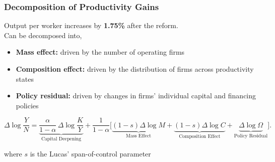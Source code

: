\documentclass[aspectratio=169,xcolor=table]{beamer}
\begin{document}
\begin{frame}[label=Decomp_main] \frametitle{Decomposition of Productivity Gains  \hfill  \hyperlink{decompA}{}}

Output per worker increases by \textbf{1.75\%} after the reform. \vspace{3mm} \\

Can be decomposed into,
\begin{itemize} \small
    \item \textbf{Mass effect:} driven by the number of operating firms  
    \item \textbf{Composition effect:} driven by the distribution of firms across productivity states 
    \item \textbf{Policy residual:} driven by changes in firms’ individual capital and financing policies 
\end{itemize} \normalsize


\[
\Delta\log\frac{Y}{N}
= \underbrace{\frac{\alpha}{1-\alpha}\,\Delta\log\frac{K}{Y}}_{\text{Capital Deepening}}
+ \frac{1}{1-\alpha}\Big[
\underbrace{(1-s)\Delta\log M}_{\text{Mass Effect}} +  
\underbrace{(1-s)\Delta\log C}_{\text{Composition Effect}} + 
\underbrace{\Delta\log\Omega}_{\text{Policy Residual}}\Big].
\] 

\small where $s$ is the Lucas' span-of-control parameter



\end{frame}
\end{document}
